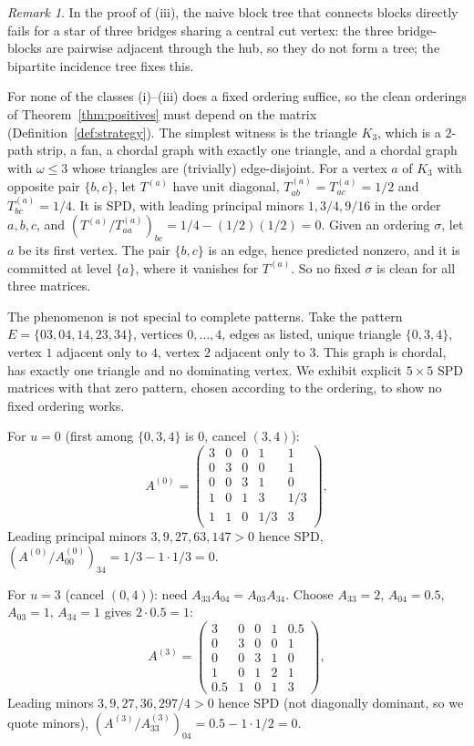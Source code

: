 \documentclass[11pt]{article}
\theoremstyle{plain}
\theoremstyle{definition}
\theoremstyle{remark}
\newtheorem{remark}[theorem]{Remark}
\begin{document}
\begin{humanaiblock}
\begin{remark}\label{rem:no-fixed}
    In the proof of (iii), the naive block tree that connects blocks directly fails for a star of three bridges sharing a central cut vertex: the three bridge-blocks are pairwise adjacent through the hub, so they do not form a tree; the bipartite incidence tree fixes this.

For none of the classes (i)--(iii) does a fixed ordering suffice, so the clean orderings of
Theorem~\ref{thm:positives} must depend on the matrix (Definition~\ref{def:strategy}). The simplest
witness is the triangle $K_3$, which is a $2$-path strip, a fan, a chordal graph with exactly one
triangle, and a chordal graph with $\omega\le3$ whose triangles are (trivially) edge-disjoint. For a
vertex $a$ of $K_3$ with opposite pair $\{b,c\}$, let $T^{(a)}$ have unit diagonal,
$T^{(a)}_{ab}=T^{(a)}_{ac}=1/2$ and $T^{(a)}_{bc}=1/4$. It is SPD, with leading principal minors
$1,3/4,9/16$ in the order $a,b,c$, and $(T^{(a)}/T^{(a)}_{aa})_{bc}=1/4-(1/2)(1/2)=0$. Given an ordering
$\sigma$, let $a$ be its first vertex. The pair $\{b,c\}$ is an edge, hence predicted nonzero, and it
is committed at level $\{a\}$, where it vanishes for $T^{(a)}$. So no fixed $\sigma$ is clean for all
three matrices.

The phenomenon is not special to complete patterns. Take the pattern $E=\{03,04,14,23,34\}$, vertices $0,\dots,4$, edges as listed, unique triangle $\{0,3,4\}$, vertex $1$ adjacent only to $4$, vertex $2$ adjacent only to $3$. This graph is chordal, has exactly one triangle and no dominating vertex. We exhibit explicit $5\times5$ SPD matrices with that zero pattern, chosen according to the ordering, to show no fixed ordering works.

For $u=0$ (first among $\{0,3,4\}$ is $0$, cancel $(3,4)$):
\[
A^{(0)}=\begin{pmatrix}
3&0&0&1&1\\
0&3&0&0&1\\
0&0&3&1&0\\
1&0&1&3&1/3\\
1&1&0&1/3&3
\end{pmatrix},
\]
Leading principal minors $3,9,27,63,147>0$ hence SPD, $(A^{(0)}/A^{(0)}_{00})_{34}=1/3-1\cdot1/3=0$.

For $u=3$ (cancel $(0,4)$): need $A_{33}A_{04}=A_{03}A_{34}$. Choose $A_{33}=2$, $A_{04}=0.5$, $A_{03}=1$, $A_{34}=1$ gives $2\cdot0.5=1$:
\[
A^{(3)}=\begin{pmatrix}
3&0&0&1&0.5\\
0&3&0&0&1\\
0&0&3&1&0\\
1&0&1&2&1\\
0.5&1&0&1&3
\end{pmatrix},
\]
Leading minors $3,9,27,36,297/4>0$ hence SPD (not diagonally dominant, so we quote minors), $(A^{(3)}/A^{(3)}_{33})_{04}=0.5-1\cdot1/2=0$.


\end{remark}
\end{humanaiblock}
\end{document}

